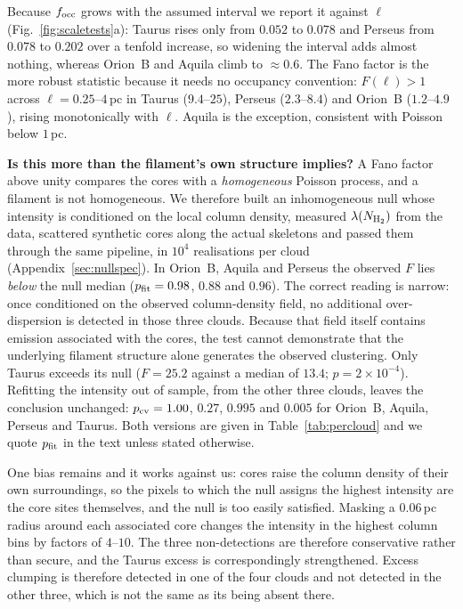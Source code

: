 \documentclass[usenatbib,twoside,twocolumn]{mnras}
\begin{document}
Because $f_{\rm occ}$ grows with the assumed interval we report it against $\ell$ (Fig.~\ref{fig:scaletests}a): Taurus rises only from $0.052$ to $0.078$ and Perseus from $0.078$ to $0.202$ over a tenfold increase, so widening the interval adds almost nothing, whereas Orion~B and Aquila climb to $\approx0.6$. The Fano factor is the more robust statistic because it needs no occupancy convention: $F(\ell)>1$ across $\ell=0.25$--$4$\,pc in Taurus ($9.4$--$25$), Perseus ($2.3$--$8.4$) and Orion~B ($1.2$--$4.9$), rising monotonically with $\ell$. Aquila is the exception, consistent with Poisson below $1$\,pc.

\smallskip\noindent\textbf{Is this more than the filament's own structure implies?} A Fano factor above unity compares the cores with a \emph{homogeneous} Poisson process, and a filament is not homogeneous. We therefore built an inhomogeneous null whose intensity is conditioned on the local column density, measured $\lambda(N_{\rm H_2})$ from the data, scattered synthetic cores along the actual skeletons and passed them through the same pipeline, in $10^4$ realisations per cloud (Appendix~\ref{sec:nullspec}). In Orion~B, Aquila and Perseus the observed $F$ lies \emph{below} the null median ($p_{\rm fit}=0.98$, $0.88$ and $0.96$). The correct reading is narrow: once conditioned on the observed column-density field, no additional over-dispersion is detected in those three clouds. Because that field itself contains emission associated with the cores, the test cannot demonstrate that the underlying filament structure alone generates the observed clustering. Only Taurus exceeds its null ($F=25.2$ against a median of $13.4$; $p=2\times10^{-4}$). Refitting the intensity out of sample, from the other three clouds, leaves the conclusion unchanged: $p_{\rm cv}=1.00$, $0.27$, $0.995$ and $0.005$ for Orion~B, Aquila, Perseus and Taurus. Both versions are given in Table~\ref{tab:percloud} and we quote $p_{\rm fit}$ in the text unless stated otherwise.

One bias remains and it works against us: cores raise the column density of their own surroundings, so the pixels to which the null assigns the highest intensity are the core sites themselves, and the null is too easily satisfied. Masking a $0.06$\,pc radius around each associated core changes the intensity in the highest column bins by factors of $4$--$10$. The three non-detections are therefore conservative rather than secure, and the Taurus excess is correspondingly strengthened. Excess clumping is therefore detected in one of the four clouds and not detected in the other three, which is not the same as its being absent there.
\end{document}
